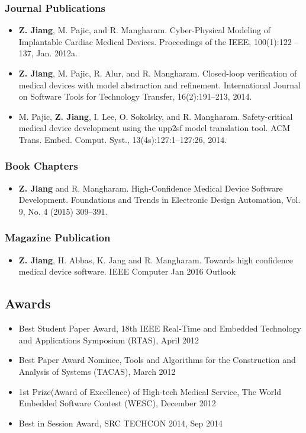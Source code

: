 \documentclass[a4paper,11pt]{article}
\begin{document}
\subsubsection{Journal Publications}
\begin{itemize}
\item \textbf{Z. Jiang}, M. Pajic, and R. Mangharam. Cyber-Physical Modeling of Implantable
Cardiac Medical Devices. Proceedings of the IEEE, 100(1):122 –137, Jan. 2012a.
\item \textbf{Z. Jiang}, M. Pajic, R. Alur, and R. Mangharam. Closed-loop verification of medical
devices with model abstraction and refinement. International Journal on Software
Tools for Technology Transfer, 16(2):191–213, 2014.
\item M. Pajic, \textbf{Z. Jiang}, I. Lee, O. Sokolsky, and R. Mangharam. Safety-critical medical
device development using the upp2sf model translation tool. ACM Trans. Embed.
Comput. Syst., 13(4s):127:1–127:26, 2014.
\end{itemize}
\subsubsection{Book Chapters}
\begin{itemize}
\item \textbf{Z. Jiang} and R. Mangharam. High-Confidence Medical Device Software
Development. Foundations and Trends in Electronic Design Automation, Vol. 9, No. 4 (2015) 309–391.
\end{itemize}
\subsubsection{Magazine Publication}
\begin{itemize}
\item \textbf{Z. Jiang}, H. Abbas, K. Jang and R. Mangharam. Towards high confidence medical device software. IEEE Computer Jan 2016 Outlook
\end{itemize}
\subsection{Awards}

\begin{itemize}
	\item Best Student Paper Award, 18th IEEE Real-Time and Embedded Technology and Applications Symposium (RTAS), April 2012
	\item Best Paper Award Nominee, Tools and Algorithms for the Construction and Analysis of Systems (TACAS), March 2012
	\item 1st Prize(Award of Excellence) of High-tech Medical Service, The World Embedded Software Contest (WESC), December 2012
	\item Best in Session Award, SRC TECHCON 2014, Sep 2014
\end{itemize}
\end{document}
